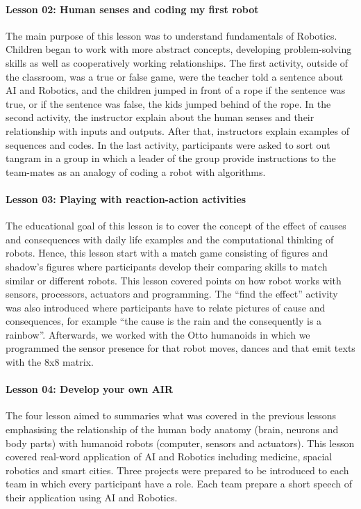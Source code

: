 \documentclass[conference]{IEEEtran}
\begin{document}
\paragraph{Lesson 02: Human senses and coding my first robot} 
The main purpose of this lesson was to understand fundamentals of Robotics. 
Children began to work with more abstract concepts, developing problem-solving skills as well as cooperatively working relationships. 
The first activity, outside of the classroom, was a true or false game, were the teacher told a sentence about AI and Robotics, and the children jumped in front of a rope if the sentence was true, or if the sentence was false, the kids jumped behind of the rope.
In the second activity, the instructor explain about the human senses and their relationship with inputs and outputs. After that, instructors explain examples of sequences and codes. 
In the last activity, participants were asked to sort out tangram in a group in which a leader of the group provide instructions to the team-mates as an analogy of coding a robot with algorithms.

\paragraph{Lesson 03: Playing with reaction-action activities} 
The educational goal of this lesson is to cover the concept of the effect of causes and consequences with daily life examples and the computational thinking of robots.
Hence, this lesson start with a match game consisting of figures and shadow’s figures where participants develop their comparing skills to match similar or different robots.
This lesson covered points on how robot works with sensors, processors, actuators and programming. 
The “find the effect” activity was also introduced where participants have to relate pictures of cause and consequences, for example “the cause is the rain and the consequently is a rainbow”.
Afterwards, we worked with the Otto humanoids in which we programmed the sensor presence for that robot moves, dances and that emit texts with the 8x8 matrix.

\paragraph{Lesson 04: Develop your own AIR}
The four lesson aimed to summaries what was covered in the previous lessons emphasising the relationship of the human body anatomy (brain, neurons and body parts) with humanoid robots (computer, sensors and actuators).
This lesson covered real-word application of AI and Robotics including medicine, spacial robotics and smart cities. 
Three projects were prepared to be introduced to each team in which every participant have a role. 
Each team prepare a short speech of their application using AI and Robotics. 
\end{document}
